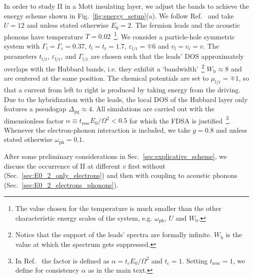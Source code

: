 \documentclass[aps,prb,groupedaddress,showpacs,twocolumn,superscriptaddress,10pt]{revtex4-2}
\newcommand{\resub}[1]{{\color{hblue} #1}}
\begin{document}
In order to study II in a Mott insulating layer, we adjust the bands to achieve the energy scheme shown in Fig.~\ref{fig:energy_setup}(a). We follow Ref.~\cite{so.do.18} and take $U=12$ and unless stated otherwise $E_0=2$. The fermion leads and the acoustic phonons have temperature $T=0.02$~\footnote{\resub{The value chosen for the temperature is much smaller than the other characteristic energy scales of the system, e.g. $\omega_{\text{ph}}$, $U$ and $W_{\text{b}}$.}}. We consider a particle-hole symmetric system with $\Gamma_{\text{l}}=\Gamma_{\text{r}}=0.37$, $t_{\text{l}}=t_{\text{r}}=1.7$, $\varepsilon_{\text{l}/\text{r}}=\mp 6$ and $v_{\text{l}}=v_{\text{r}}=v$. The parameters $t_{\text{l/r}}$, $\varepsilon_{\text{l/r}}$, and  $\Gamma_{\text{l/r}}$ are chosen such that the leads' DOS approximately overlaps with the Hubbard bands, i.e. they exhibit a \textquoteleft bandwidth\textquoteright~\footnote{Notice that the support of the leads' spectra are formally infinite. $W_{\text{b}}$ is the value at which the spectrum gets  suppressed.} $W_{\text{b}}\approx 8$ and are centered at the same position. The chemical potentials are set to $\mu_{\text{l}/\text{r}} =\mp 1$, so that a current from left to right is produced by taking energy from the driving. Due to the hybridization with the leads, the local DOS of the Hubbard layer only features a pseudogap
 $\Delta_{\text{pg}} \approx 4$. All simulations are carried out with the dimensionless factor $\alpha\equiv t_{\text{resc}}E_0/\Omega^{2}<0.5$ for which the FDSA is justified~\footnote{In Ref.~\cite{so.do.18} the factor is defined as $\alpha=t_{c}E_0/\Omega^{2}$ and $t_{\text{c}}=1$. Setting $t_{\text{resc}}=1$, we define for consistency $\alpha$ as in the main text.}. Whenever the electron-phonon interaction is included, we take $g=0.8$ and unless stated otherwise $\omega_{\text{ph}}=0.1$.  

After some preliminary considerations in Sec.~\ref{sec:explicative_scheme}, we discuss the occurrence of II at different $v$ first without (Sec.~\ref{sec:E0_2_only_electrons}) and then with coupling to acoustic phonons (Sec.~\ref{sec:E0_2_electrons_phonons}). 
\end{document}
